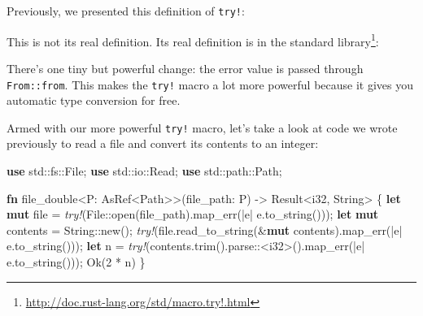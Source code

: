 \documentclass[a4paper,]{book}
\newenvironment{Shaded}{\begin{snugshade}}{\end{snugshade}}
\newcommand{\KeywordTok}[1]{\textcolor[rgb]{0.13,0.29,0.53}{\textbf{{#1}}}}
\newcommand{\DataTypeTok}[1]{\textcolor[rgb]{0.13,0.29,0.53}{{#1}}}
\newcommand{\DecValTok}[1]{\textcolor[rgb]{0.00,0.00,0.81}{{#1}}}
\newcommand{\ConstantTok}[1]{\textcolor[rgb]{0.00,0.00,0.00}{{#1}}}
\newcommand{\PreprocessorTok}[1]{\textcolor[rgb]{0.56,0.35,0.01}{\textit{{#1}}}}
\newcommand{\NormalTok}[1]{{#1}}
\renewcommand{\href}[2]{#2\footnote{\url{#1}}}
\begin{document}
Previously, we presented this definition of \texttt{try!}:

\begin{Shaded}
\end{Shaded}

This is not its real definition. Its real definition is
\href{http://doc.rust-lang.org/std/macro.try!.html}{in the standard
library}:

\protect\hypertarget{code-try-def}{}{}

\begin{Shaded}
\end{Shaded}

There's one tiny but powerful change: the error value is passed through
\texttt{From::from}. This makes the \texttt{try!} macro a lot more
powerful because it gives you automatic type conversion for free.

Armed with our more powerful \texttt{try!} macro, let's take a look at
code we wrote previously to read a file and convert its contents to an
integer:

\begin{Shaded}
\begin{Highlighting}[]
\KeywordTok{use} \NormalTok{std::fs::File;}
\KeywordTok{use} \NormalTok{std::io::Read;}
\KeywordTok{use} \NormalTok{std::path::Path;}

\KeywordTok{fn} \NormalTok{file_double<P: AsRef<Path>>(file_path: P) -> }\DataTypeTok{Result}\NormalTok{<}\DataTypeTok{i32}\NormalTok{, }\DataTypeTok{String}\NormalTok{> \{}
    \KeywordTok{let} \KeywordTok{mut} \NormalTok{file = }\PreprocessorTok{try!}\NormalTok{(File::open(file_path).map_err(|e| e.to_string()));}
    \KeywordTok{let} \KeywordTok{mut} \NormalTok{contents = }\DataTypeTok{String}\NormalTok{::new();}
    \PreprocessorTok{try!}\NormalTok{(file.read_to_string(&}\KeywordTok{mut} \NormalTok{contents).map_err(|e| e.to_string()));}
    \KeywordTok{let} \NormalTok{n = }\PreprocessorTok{try!}\NormalTok{(contents.trim().parse::<}\DataTypeTok{i32}\NormalTok{>().map_err(|e| e.to_string()));}
    \ConstantTok{Ok}\NormalTok{(}\DecValTok{2} \NormalTok{* n)}
\NormalTok{\}}
\end{Highlighting}
\end{Shaded}
\end{document}
